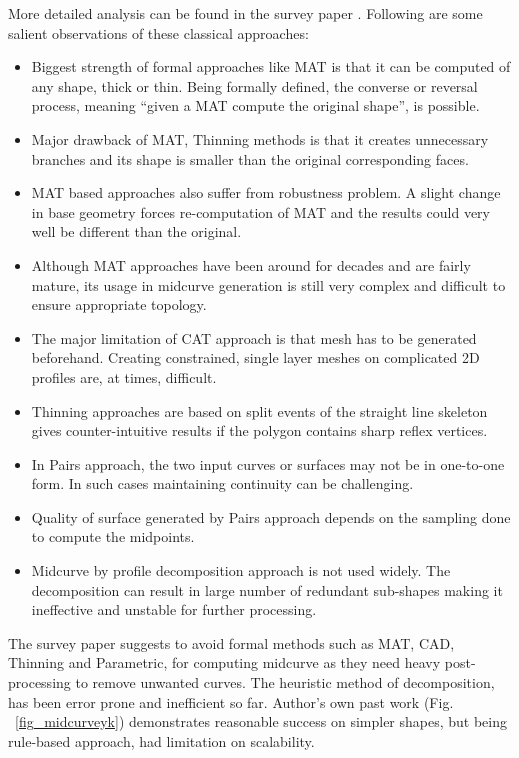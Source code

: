 \documentclass[9pt,academicons]{article}
\begin{document}
More detailed analysis can be found in the survey paper \cite{medial2010}.
Following are some salient observations of these classical approaches:
\begin{itemize}[noitemsep,topsep=2pt,parsep=2pt,partopsep=2pt]
	\item Biggest strength of formal approaches like MAT is that it can be computed of any shape, thick or thin. Being formally defined, the converse or reversal process, meaning ``given a MAT compute the original shape'', is possible.
	\item Major drawback of MAT, Thinning methods is that it creates unnecessary branches and its shape is smaller than the original corresponding faces.
	\item  MAT based approaches also suffer from robustness problem. A slight change in base geometry forces re-computation of MAT and the results could very well be different than the original.
	\item Although MAT approaches have been around for decades and are fairly mature, its usage in midcurve generation is still very complex and difficult to ensure appropriate topology.
	\item The major limitation of CAT approach is that mesh has to be generated beforehand. Creating constrained, single layer meshes on complicated 2D profiles are, at times, difficult.
	\item Thinning approaches are based on split events of the straight line skeleton gives counter-intuitive results if the polygon contains sharp reflex vertices.
	\item In Pairs approach, the two input curves or surfaces may not be in one-to-one form. In such cases maintaining continuity can be challenging.
	\item Quality of surface generated by Pairs approach depends on the sampling done to compute the midpoints.
\item Midcurve by profile decomposition approach is not used widely. The decomposition can result in large number of redundant sub-shapes making it ineffective and unstable for further processing.
\end{itemize}


The survey paper \cite{medial2010} suggests to avoid formal methods such as MAT, CAD, Thinning and Parametric, for computing midcurve as they need heavy post-processing to remove unwanted curves. The heuristic method of decomposition,  has been error prone and inefficient so far. Author's own past work (Fig. ~\ref{fig_midcurveyk}) demonstrates reasonable success on simpler shapes, but being rule-based approach, had limitation on scalability.
\end{document}
